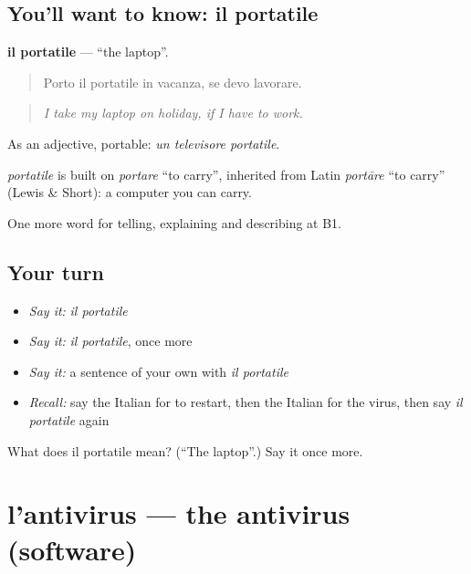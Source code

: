 \subsection*{You'll want to know: il portatile}
\textbf{il portatile} — \textquotedblleft{}the laptop\textquotedblright{}.

\begin{quote}
Porto il portatile in vacanza, se devo lavorare.
\end{quote}

\begin{quote}
\emph{I take my laptop on holiday, if I have to work.}
\end{quote}

As an adjective, portable: \emph{un televisore portatile}.

\begin{cousinweb}
\emph{portatile} is built on \emph{portare} \textquotedblleft{}to carry\textquotedblright{}, inherited from Latin \emph{portāre} \textquotedblleft{}to carry\textquotedblright{} (Lewis \& Short): a computer you can carry.
\end{cousinweb}

\begin{grammarlens}[title={What you've built}]
One more word for telling, explaining and describing at B1.
\end{grammarlens}

\subsection*{Your turn}
\begin{itemize}
\raggedright
  \item \emph{Say it:} \emph{il portatile}
  \item \emph{Say it:} \emph{il portatile}, once more
  \item \emph{Say it:} a sentence of your own with \emph{il portatile}
  \item \emph{Recall:} say the Italian for to restart, then the Italian for the virus, then say \emph{il portatile} again
\end{itemize}

\begin{tcolorbox}[breakable,colback=teal!4,colframe=teal!35!black,title={Before you move on}]
What does il portatile mean? (\textquotedblleft{}The laptop\textquotedblright{}.) Say it once more.
\end{tcolorbox}
\section[l'antivirus]{l'antivirus — the antivirus (software)}

